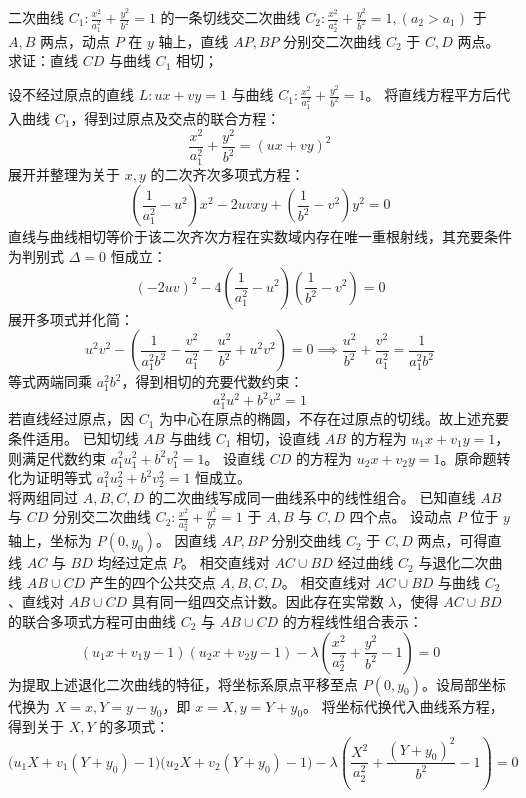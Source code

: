 \begin{example}
二次曲线 $C_1: \frac{x^2}{a_1^2} + \frac{y^2}{b^2} = 1$ 的一条切线交二次曲线 $C_2: \frac{x^2}{a_2^2} + \frac{y^2}{b^2} = 1,(a_2>a_1)$ 于 $A,B$ 两点，动点 $P$ 在 $y$ 轴上，直线 $AP,BP$ 分别交二次曲线 $C_2$ 于 $C,D$ 两点。求证：直线 $CD$ 与曲线 $C_1$ 相切；
\end{example}
\begin{solution}
设不经过原点的直线 $L: ux + vy = 1$ 与曲线 $C_1: \frac{x^2}{a_1^2} + \frac{y^2}{b^2} = 1$。
将直线方程平方后代入曲线 $C_1$，得到过原点及交点的联合方程：
$$ \frac{x^2}{a_1^2} + \frac{y^2}{b^2} = (ux + vy)^2 $$
展开并整理为关于 $x, y$ 的二次齐次多项式方程：
$$ \left(\frac{1}{a_1^2} - u^2\right)x^2 - 2uvxy + \left(\frac{1}{b^2} - v^2\right)y^2 = 0 $$
直线与曲线相切等价于该二次齐次方程在实数域内存在唯一重根射线，其充要条件为判别式 $\Delta = 0$ 恒成立：
$$ (-2uv)^2 - 4\left(\frac{1}{a_1^2} - u^2\right)\left(\frac{1}{b^2} - v^2\right) = 0 $$
展开多项式并化简：
$$ u^2 v^2 - \left(\frac{1}{a_1^2 b^2} - \frac{v^2}{a_1^2} - \frac{u^2}{b^2} + u^2 v^2\right) = 0 \implies \frac{u^2}{b^2} + \frac{v^2}{a_1^2} = \frac{1}{a_1^2 b^2} $$
等式两端同乘 $a_1^2 b^2$，得到相切的充要代数约束：
$$ a_1^2 u^2 + b^2 v^2 = 1 $$
若直线经过原点，因 $C_1$ 为中心在原点的椭圆，不存在过原点的切线。故上述充要条件适用。
已知切线 $AB$ 与曲线 $C_1$ 相切，设直线 $AB$ 的方程为 $u_1 x + v_1 y = 1$，则满足代数约束 $a_1^2 u_1^2 + b^2 v_1^2 = 1$。
设直线 $CD$ 的方程为 $u_2 x + v_2 y = 1$。原命题转化为证明等式 $a_1^2 u_2^2 + b^2 v_2^2 = 1$ 恒成立。\\
将两组同过 $A,B,C,D$ 的二次曲线写成同一曲线系中的线性组合。
已知直线 $AB$ 与 $CD$ 分别交二次曲线 $C_2: \frac{x^2}{a_2^2} + \frac{y^2}{b^2} = 1$ 于 $A, B$ 与 $C, D$ 四个点。
设动点 $P$ 位于 $y$ 轴上，坐标为 $P(0, y_0)$。
因直线 $AP, BP$ 分别交曲线 $C_2$ 于 $C, D$ 两点，可得直线 $AC$ 与 $BD$ 均经过定点 $P$。
相交直线对 $AC \cup BD$ 经过曲线 $C_2$ 与退化二次曲线 $AB \cup CD$ 产生的四个公共交点 $A, B, C, D$。
相交直线对 $AC \cup BD$ 与曲线 $C_2$、直线对 $AB \cup CD$ 具有同一组四交点计数。因此存在实常数 $\lambda$，使得 $AC \cup BD$ 的联合多项式方程可由曲线 $C_2$ 与 $AB \cup CD$ 的方程线性组合表示：
$$ (u_1 x + v_1 y - 1)(u_2 x + v_2 y - 1) - \lambda \left( \frac{x^2}{a_2^2} + \frac{y^2}{b^2} - 1 \right) = 0 $$
为提取上述退化二次曲线的特征，将坐标系原点平移至点 $P(0, y_0)$。设局部坐标代换为 $X = x, Y = y - y_0$，即 $x = X, y = Y + y_0$。
将坐标代换代入曲线系方程，得到关于 $X, Y$ 的多项式：
$$ \big(u_1 X + v_1 (Y + y_0) - 1\big)\big(u_2 X + v_2 (Y + y_0) - 1\big) - \lambda \left( \frac{X^2}{a_2^2} + \frac{(Y+y_0)^2}{b^2} - 1 \right) = 0 $$

\end{solution}
